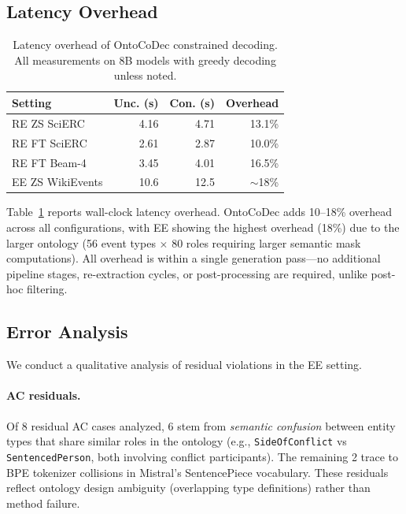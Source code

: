 \documentclass[11pt]{article}
\newcommand{\sys}{OntoCoDec}
\begin{document}
\subsection{Latency Overhead}

\begin{table}[t]
\centering
\caption{Latency overhead of \sys{} constrained decoding. All measurements on 8B models with greedy decoding unless noted.}
\label{tab:latency}
\small
\begin{tabular}{l rr r}
\toprule
\textbf{Setting} & \textbf{Unc. (s)} & \textbf{Con. (s)} & \textbf{Overhead} \\
\midrule
RE ZS SciERC & 4.16 & 4.71 & 13.1\% \\
RE FT SciERC & 2.61 & 2.87 & 10.0\% \\
RE FT Beam-4 & 3.45 & 4.01 & 16.5\% \\
EE ZS WikiEvents & 10.6 & 12.5 & $\sim$18\% \\
\bottomrule
\end{tabular}
\end{table}

Table~\ref{tab:latency} reports wall-clock latency overhead.
\sys{} adds 10--18\% overhead across all configurations, with EE showing the highest overhead (18\%) due to the larger ontology (56 event types $\times$ 80 roles requiring larger semantic mask computations).
All overhead is within a single generation pass---no additional pipeline stages, re-extraction cycles, or post-processing are required, unlike post-hoc filtering.

\subsection{Error Analysis}
\label{sec:error}

We conduct a qualitative analysis of residual violations in the EE setting.

\paragraph{AC residuals.}
Of 8 residual AC cases analyzed, 6 stem from \emph{semantic confusion} between entity types that share similar roles in the ontology (e.g., \texttt{SideOfConflict} vs \texttt{SentencedPerson}, both involving conflict participants).
The remaining 2 trace to BPE tokenizer collisions in Mistral's SentencePiece vocabulary.
These residuals reflect ontology design ambiguity (overlapping type definitions) rather than method failure.
\end{document}
